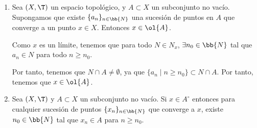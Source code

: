 \begin{ejercicio}
\begin{enumerate}[label=\alph*)]

        Notemos que en la demostración tan solo se usa que $\bb{R}$ no es numerable, por lo que este resultado es cierto para todo $(X,\T_{CF})$ con $X$ no numerable.

        \item Sea $(X,\T)$ un espacio topológico, y $A\subset X$ un subconjunto no vacío. Supongamos que existe $\{a_n\}_{n\in \bb{N}}$ una sucesión de puntos en $A$ que converge a un punto $x\in X$. Entonces $x\in \ol{A}$.

        Como $x$ es un límite, tenemos que para todo $N\in N_x$, $\exists n_0\in \bb{N}$ tal que $a_n\in N$ para todo $n\geq n_0$.

        Por tanto, tenemos que $N\cap A\neq \emptyset$, ya que $\{a_n\mid n\geq n_0\}\subset N\cap A$. Por tanto, tenemos que $x\in \ol{A}$.

        \item Sea $(X,\T)$ y $A\subset X$ un subconjunto no vacío. Si $x\in A^\circ$ entonces para cualquier sucesión de puntos $\{x_n\}_{n\in \bb{N}}$ que converge a $x$, existe $n_0\in \bb{N}$ tal que $x_n\in A$ para $n\geq n_0$.


\end{enumerate}
\end{ejercicio}
